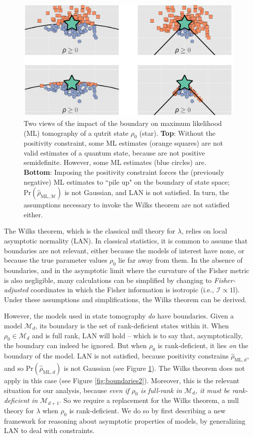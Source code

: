 \documentclass[aps,pra, twocolumn]{revtex4-1}
\newcommand{\M}{\mathcal{M}}
\newcommand{\Id}{\mathbb{I}}
\def\Id{1\!\mathrm{l}}
\newcommand{\rhohat}{\hat{\rho}}
\newcommand{\rhoML}[1]{\rhohat_{\scriptscriptstyle{\mathrm{ML},#1}}}
\begin{document}
\begin{figure}
\includegraphics[width=\columnwidth]{Images/Figure_1.pdf}
 \caption{Two views of the impact of the boundary on maximum likelihood (ML) tomography of a qutrit state $\rho_{0}$ (star). \textbf{Top}: Without the positivity constraint, some ML estimates (orange squares) are not valid estimates of a quantum state, because are not positive semidefinite. However, some ML estimates (blue circles) are.
\textbf{Bottom}:  Imposing the positivity constraint forces the (previously negative) ML estimates to ``pile up" on the boundary of state space; $\mathrm{Pr}(\rhoML{\M})$ is not Gaussian, and LAN is not satisfied. In turn, the assumptions necessary to invoke the Wilks theorem are not satisfied either.}
\label{fig:boundaries}
\end{figure}


The Wilks theorem, which is the classical null theory for $\lambda$, relies on local asymptotic normality (LAN). In classical statistics, it is common to assume that boundaries are not relevant, either because the models of interest have none, or because the true parameter values $\rho_{0}$ lie far away from them.  In the absence of boundaries, and in the asymptotic limit where the curvature of the Fisher metric is also negligible, many calculations can be simplified by changing to \emph{Fisher-adjusted} coordinates in which the Fisher information is isotropic (i.e., $\mathcal{I}\propto\Id$). Under these assumptions and simplifications, the Wilks theorem can be derived.

However, the models used in state tomography \emph{do} have boundaries. Given a model $\M_{d}$, its boundary is the set of rank-deficient states within it. When $\rho_{0}\in \M_{d}$ and is full rank, LAN will hold -- which is to say that, asymptotically, the boundary can indeed be ignored. But when $\rho_{0}$ is rank-deficient, it lies \emph{on} the boundary of the model.  LAN is not satisfied, because positivity constrains $\rhoML{d}$, and so $\mathrm{Pr}(\rhoML{d})$ is not Gaussian (see Figure \ref{fig:boundaries}).  The Wilks theorem does not apply in this case  (see Figure \ref{fig:boundaries2}). Moreover, this is the relevant situation for our analysis, because \emph{even if $\rho_{0}$ is full-rank in $\M_{d}$, it must be rank-deficient in $\M_{d+1}$}.  So we require a replacement for the Wilks theorem, a null theory for $\lambda$ when $\rho_0$ is rank-deficient. We do so by first describing a new framework for reasoning about asymptotic properties of models, by generalizing LAN to deal with constraints.
\end{document}
